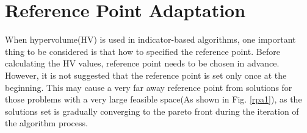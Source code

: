 \documentclass[conference]{IEEEtran}
\begin{document}


%
%
\section{Reference Point Adaptation}
When hypervolume(HV) is used in indicator-based algorithms, 
one important thing to be considered is that how to specified the reference point.
Before calculating the HV values, reference point needs to be chosen in advance.
However, it is not suggested that the reference point is set only once at the beginning.
\cite{ut}  %
This may cause a very far away reference point from solutions
for those problems with a very large feasible space(As shown in Fig. \ref{rpa1}),
as the solutions set is gradually converging to the pareto front
during the iteration of the algorithm process.
\end{document}

